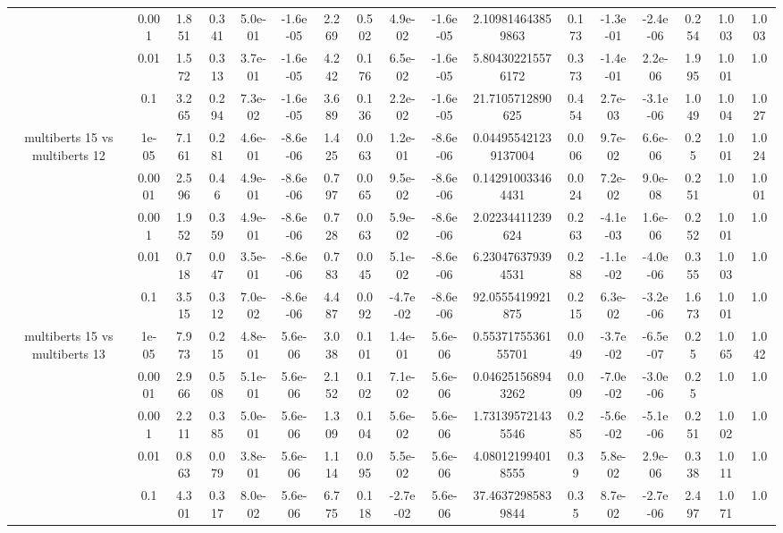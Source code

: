 \begin{tabular}{|c|c|c|c|c|c|c|c|c|c|c|c|c|c|c|c|c|}
 & 0.001 & 1.851 & 0.341 & 5.0e-01 & -1.6e-05 & 2.269 & 0.502 & 4.9e-02 & -1.6e-05 & 2.109814643859863 & 0.173 & -1.3e-01 & -2.4e-06 & 0.254 & 1.003 & 1.003 \\
 & 0.01 & 1.572 & 0.313 & 3.7e-01 & -1.6e-05 & 4.242 & 0.176 & 6.5e-02 & -1.6e-05 & 5.804302215576172 & 0.373 & -1.4e-01 & 2.2e-06 & 1.995 & 1.001 & 1.0 \\
 & 0.1 & 3.265 & 0.294 & 7.3e-02 & -1.6e-05 & 3.689 & 0.136 & 2.2e-02 & -1.6e-05 & 21.7105712890625 & 0.454 & 2.7e-03 & -3.1e-06 & 1.049 & 1.004 & 1.027 \\
\hline
\multirow{5}{*}{multiberts 15 vs multiberts 12} & 1e-05 & 7.161 & 0.281 & 4.6e-01 & -8.6e-06 & 1.425 & 0.063 & 1.2e-01 & -8.6e-06 & 0.044955421239137004 & 0.006 & 9.7e-02 & 6.6e-06 & 0.25 & 1.001 & 1.024 \\
 & 0.0001 & 2.596 & 0.46 & 4.9e-01 & -8.6e-06 & 0.797 & 0.065 & 9.5e-02 & -8.6e-06 & 0.142910033464431 & 0.024 & 7.2e-02 & 9.0e-08 & 0.251 & 1.0 & 1.001 \\
 & 0.001 & 1.952 & 0.359 & 4.9e-01 & -8.6e-06 & 0.728 & 0.063 & 5.9e-02 & -8.6e-06 & 2.02234411239624 & 0.263 & -4.1e-03 & 1.6e-06 & 0.252 & 1.001 & 1.0 \\
 & 0.01 & 0.718 & 0.047 & 3.5e-01 & -8.6e-06 & 0.783 & 0.045 & 5.1e-02 & -8.6e-06 & 6.230476379394531 & 0.288 & -1.1e-02 & -4.0e-06 & 0.355 & 1.003 & 1.0 \\
 & 0.1 & 3.515 & 0.312 & 7.0e-02 & -8.6e-06 & 4.487 & 0.092 & -4.7e-02 & -8.6e-06 & 92.0555419921875 & 0.215 & 6.3e-02 & -3.2e-06 & 1.673 & 1.001 & 1.0 \\
\hline
\multirow{5}{*}{multiberts 15 vs multiberts 13} & 1e-05 & 7.973 & 0.215 & 4.8e-01 & 5.6e-06 & 3.038 & 0.101 & 1.4e-01 & 5.6e-06 & 0.5537175536155701 & 0.049 & -3.7e-02 & -6.5e-07 & 0.25 & 1.065 & 1.042 \\
 & 0.0001 & 2.966 & 0.508 & 5.1e-01 & 5.6e-06 & 2.152 & 0.102 & 7.1e-02 & 5.6e-06 & 0.046251568943262 & 0.009 & -7.0e-02 & -3.0e-06 & 0.25 & 1.0 & 1.0 \\
 & 0.001 & 2.211 & 0.385 & 5.0e-01 & 5.6e-06 & 1.309 & 0.104 & 5.6e-02 & 5.6e-06 & 1.731395721435546 & 0.285 & -5.6e-02 & -5.1e-06 & 0.251 & 1.002 & 1.0 \\
 & 0.01 & 0.863 & 0.079 & 3.8e-01 & 5.6e-06 & 1.114 & 0.095 & 5.5e-02 & 5.6e-06 & 4.080121994018555 & 0.39 & 5.8e-02 & 2.9e-06 & 0.338 & 1.011 & 1.0 \\
 & 0.1 & 4.301 & 0.317 & 8.0e-02 & 5.6e-06 & 6.775 & 0.118 & -2.7e-02 & 5.6e-06 & 37.46372985839844 & 0.35 & 8.7e-02 & -2.7e-06 & 2.497 & 1.071 & 1.0 \\

\end{tabular}
